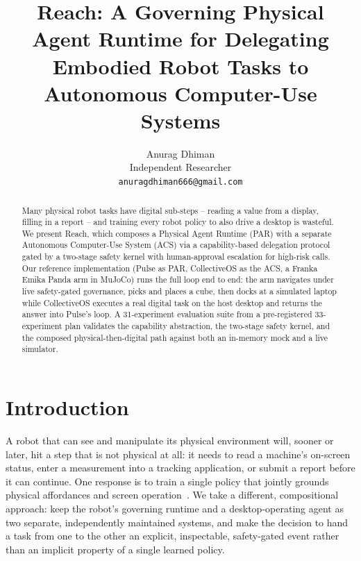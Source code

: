 \documentclass{article}
\title{Reach: A Governing Physical Agent Runtime for Delegating\\
Embodied Robot Tasks to Autonomous Computer-Use Systems}
\author{
  Anurag Dhiman \\
  Independent Researcher \\
  \texttt{anuragdhiman666@gmail.com}
}
\begin{document}
\maketitle


\begin{abstract}
Many physical robot tasks have digital sub-steps -- reading a value from a display, filling in a report -- and training every robot policy to also drive a desktop is wasteful. We present Reach, which composes a Physical Agent Runtime (PAR) with a separate Autonomous Computer-Use System (ACS) via a capability-based delegation protocol gated by a two-stage safety kernel with human-approval escalation for high-risk calls. Our reference implementation (Pulse as PAR, CollectiveOS as the ACS, a Franka Emika Panda arm in MuJoCo) runs the full loop end to end: the arm navigates under live safety-gated governance, picks and places a cube, then docks at a simulated laptop while CollectiveOS executes a real digital task on the host desktop and returns the answer into Pulse's loop. A 31-experiment evaluation suite from a pre-registered 33-experiment plan validates the capability abstraction, the two-stage safety kernel, and the composed physical-then-digital path against both an in-memory mock and a live simulator.
\end{abstract}



\section{Introduction}

A robot that can see and manipulate its physical environment will, sooner or later, hit a step that is not physical at all: it needs to read a machine's on-screen status, enter a measurement into a tracking application, or submit a report before it can continue. One response is to train a single policy that jointly grounds physical affordances and screen operation~\citep{driess2023palme, brohan2023rt2}. We take a different, compositional approach: keep the robot's governing runtime and a desktop-operating agent as two separate, independently maintained systems, and make the decision to hand a task from one to the other an explicit, inspectable, safety-gated event rather than an implicit property of a single learned policy.
\end{document}
